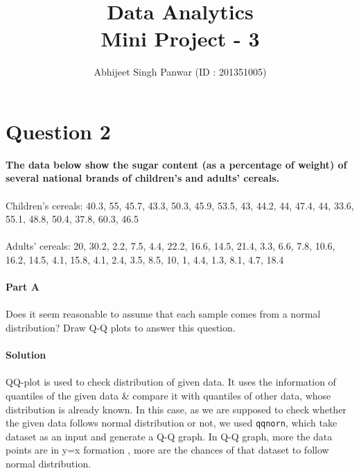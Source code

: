 \documentclass[12pt,a4paper]{report}
\author{Abhijeet Singh Panwar (ID : 201351005)}
\title{Data Analytics\\ Mini Project - 3}
\date{\parbox{\linewidth}{\centering%
  \today\endgraf\bigskip
  Instructor : \endgraf\medskip
  Prof. Bhargab Chattopadhyay\endgraf\bigskip
  Indian Institute of Information Technology, Vadodara}}
\begin{document}
\maketitle
\newpage
\section{Question 2}
\textbf{The data below show the sugar content (as a percentage of weight) of several national
brands of children’s and adults’ cereals.}
\\\\
Children’s cereals: 40.3, 55, 45.7, 43.3, 50.3, 45.9, 53.5, 43, 44.2, 44, 47.4, 44, 33.6, 55.1, 48.8, 50.4, 37.8, 60.3, 46.5\\\\
Adults’ cereals: 20, 30.2, 2.2, 7.5, 4.4, 22.2, 16.6, 14.5, 21.4, 3.3, 6.6, 7.8, 10.6, 16.2, 14.5, 4.1, 15.8, 4.1, 2.4, 3.5, 8.5, 10, 1, 4.4, 1.3, 8.1, 4.7, 18.4\\\\
\textbf{Part A}
\\\\
Does it seem reasonable to assume that each sample comes from a normal distribution? Draw Q-Q plots to answer this question.
\\\\
\textbf{Solution}\\\\
QQ-plot is used to check distribution of given data. It uses the information of quantiles of the given data \& compare it with quantiles of other data, whose distribution is already known. In this case, as we are supposed to check whether the given data follows normal distribution or not, we used \texttt{qqnorn}, which take dataset as an input and generate a Q-Q graph. In Q-Q graph, more the data points are in y=x formation , more are the chances of that dataset to follow normal distribution.\\
\end{document}
